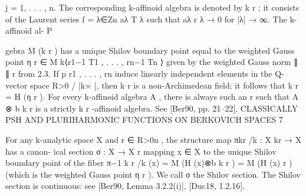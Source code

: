\documentclass[
  10pt,
]{article}
\newenvironment{Shaded}{}{}
\newcommand{\NormalTok}[1]{#1}
\begin{document}
\begin{Shaded}
\begin{Highlighting}[]
\NormalTok{j = 1, . . . , n. The corresponding      k{-}affinoid algebra is denoted by k r ; it consists of the}
\NormalTok{Laurent series f = λ∈Zn aλ T λ such that aλ r λ → 0 for |λ| → ∞. The k{-}affinoid al{-}}
\NormalTok{                           P}

\NormalTok{gebra M (k r ) has a unique Shilov        boundary point equal to the weighted Gauss point}
\NormalTok{η r ∈ M k⟨r1−1 T1 , . . . , rn−1 Tn ⟩ given by the weighted Gauss norm ∥ ∥ r from 2.3. If}
\NormalTok{                                                                                       p}
\NormalTok{r1 , . . . , rn induce linearly independent elements in the Q{-}vector space R\textgreater{}0 / |k× |, then k r}
\NormalTok{is a non{-}Archimedean field; it follows that k r = H (η r ). For every k{-}affinoid algebra A ,}
\NormalTok{there is always such an r such that A ⊗        b k r is a strictly k r {-}affinoid algebra. See [Ber90,}
\NormalTok{pp. 21–22].}
\NormalTok{             CLASSICALLY PSH AND PLURIHARMONIC FUNCTIONS ON BERKOVICH SPACES                 7}

\NormalTok{   For any k{-}analytic space X and r ∈ R\textgreater{}0n}
\NormalTok{                                             , the structure map πkr /k : X kr → X has a canon{-}}
\NormalTok{ical section σ : X → X r mapping x ∈ X to the unique Shilov boundary point of the fiber}
\NormalTok{π−1}
\NormalTok{  k r /k}
\NormalTok{         (x) = M (H (x)⊗b k r ) = M (H (x) r ) (which is the weighted Gauss point η r ). We}
\NormalTok{call σ the Shilov section. The Shilov section is continuous: see [Ber90, Lemma 3.2.2(i)],}
\NormalTok{[Duc18, 1.2.16].}


\end{Highlighting}
\end{Shaded}
\end{document}
